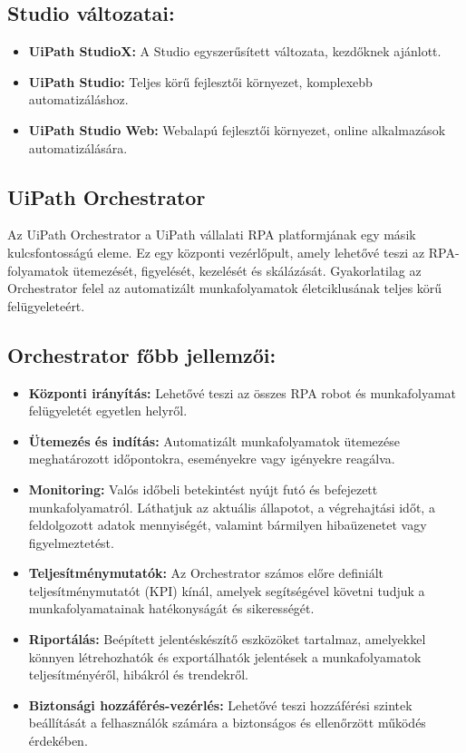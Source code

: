 \documentclass[
]{thesis-ekf}
\theoremstyle{definition}
\theoremstyle{remark}
\begin{document}
\subsection*{Studio változatai:}
	\begin{itemize}
		\item \textbf{UiPath StudioX:} A Studio egyszerűsített változata, kezdőknek ajánlott.
		\item \textbf{UiPath Studio:} Teljes körű fejlesztői környezet, komplexebb automatizáláshoz.
		\item \textbf{UiPath Studio Web:} Webalapú fejlesztői környezet, online alkalmazások automatizálására.
	\end{itemize}

	
\subsection{ UiPath Orchestrator}
Az UiPath Orchestrator a UiPath vállalati RPA platformjának egy másik kulcsfontosságú eleme. Ez egy központi vezérlőpult, amely lehetővé teszi az RPA-folyamatok ütemezését, figyelését, kezelését és skálázását. Gyakorlatilag az Orchestrator felel az automatizált munkafolyamatok életciklusának teljes körű felügyeleteért.

\subsection*{Orchestrator főbb jellemzői:}
\begin{itemize}
		\item \textbf{Központi irányítás:} Lehetővé teszi az összes RPA robot és munkafolyamat felügyeletét egyetlen helyről.
		\item \textbf{Ütemezés és indítás:} Automatizált munkafolyamatok ütemezése meghatározott időpontokra, eseményekre vagy igényekre reagálva.
		\item \textbf{Monitoring:} Valós időbeli betekintést nyújt futó és befejezett munkafolyamatról. Láthatjuk az aktuális állapotot, a végrehajtási időt, a feldolgozott adatok mennyiségét, valamint bármilyen hibaüzenetet vagy figyelmeztetést.
		\item \textbf{Teljesítménymutatók:} Az Orchestrator számos előre definiált teljesítménymutatót (KPI) kínál, amelyek segítségével követni tudjuk a  munkafolyamatainak hatékonyságát és sikerességét.
		\item \textbf{Riportálás:} Beépített jelentéskészítő eszközöket tartalmaz, amelyekkel könnyen létrehozhatók és exportálhatók jelentések a munkafolyamatok teljesítményéről, hibákról és trendekről.
		\item \textbf{Biztonsági hozzáférés-vezérlés:} Lehetővé teszi hozzáférési szintek beállítását a felhasználók számára a biztonságos és ellenőrzött működés érdekében.
\end{itemize}
\end{document}

